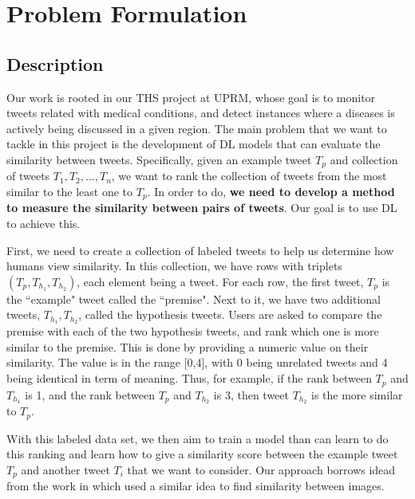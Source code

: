 \documentclass[12pt]{report}
\begin{document}
\chapter{Problem Formulation} \label{chapter 3}
\section{Description}
Our work is rooted in our \ac{THS} project at UPRM, whose goal is to monitor tweets related with medical conditions, and detect instances where
a diseases is actively being discussed in a given region.
The main problem that we want to tackle in this project is the development of  \ac{DL} models that can evaluate the similarity between
tweets. Specifically, given an example tweet $T_p$ and  collection of tweets $T_1, T_2, ..., T_n$, we want to rank the collection of tweets
from the most similar to the least one to $T_p$. In order to do, {\bf we need to develop a method to measure the similarity between pairs of 
	tweets}. Our goal is to use \ac{DL} to achieve this. 

First, we need to create a collection of labeled tweets to help us determine how humans 
view similarity. In this collection, we have rows with triplets $(T_p, T_{h_1}, T_{h_2})$, each element being a tweet. For each row, the first tweet, $T_p$ is the ``example" tweet called the ``premise". Next to it, we have two additional tweets, $T_{h_1}, T_{h_2}$, called the
hypothesis tweets. Users are asked to compare the premise with each of the two hypothesis tweets, and rank which one is more similar to the 
premise. This is done by providing a numeric value on their similarity. The value is in the range [0,4], with 0 being unrelated tweets and 4 being identical in term of meaning. Thus, for example, if the rank between $T_p$ and  $T_{h_1}$ is 1, and the rank between $T_p$ and  $T_{h_2}$ is 3, then 
tweet $T_{h_2}$ is the more similar to $T_p$.

With this labeled data set, we then aim to train a model than can learn to do this ranking and learn how to give a similarity score between 
the example tweet $T_p$ and another tweet $T_i$ that we want to consider. Our approach borrows idead from the work in \cite{Wang2014} which used 
a similar idea to find  similarity between images. 
\end{document}
